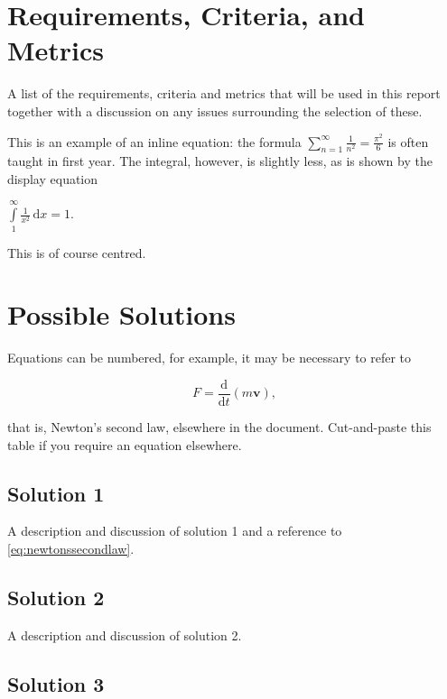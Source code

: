 \documentclass{ece}
\begin{document}
\section{Requirements, Criteria, and Metrics}

\label{sec:rcm} %

A list of the requirements, criteria and metrics that will be used in this report together with a discussion on any issues surrounding the selection of these.

This is an example of an inline equation: the formula $\sum_{n=1}^{\infty}\frac{1}{n^2}=\frac{\pi^{2}}{6}$ is often taught in first year.  The integral, however, is slightly less, as is shown by the display equation

\begin{center}
    $\int\limits_{1}^{\infty}\frac{1}{x^{2}}\, \mathrm{d}x=1$.
\end{center}

This is of course centred.

\section{Possible Solutions}

Equations can be numbered, for example, it may be necessary to refer to

\begin{equation}
    \label{eq:newtonssecondlaw}
    F=\frac{\mathrm{d}}{\mathrm{d}t}(m\mathbf{v}),
\end{equation}

that is, Newton\textquoteright s second law, elsewhere in the document.  Cut-and-paste this table if you require an equation elsewhere.

\subsection{Solution 1}

A description and discussion of solution 1 and a reference to \cref{eq:newtonssecondlaw}.

\subsection{Solution 2}

A description and discussion of solution 2.

\subsection{Solution 3}
\end{document}
